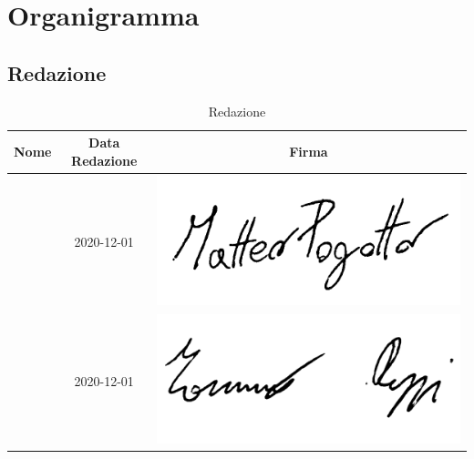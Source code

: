 \section{Organigramma}

\subsection{Redazione}

\renewcommand{\arraystretch}{1}
	\begin{table}[H]
		\begin{center}
			\setlength{\aboverulesep}{0pt}
			\setlength{\belowrulesep}{0pt}
			\setlength{\extrarowheight}{.75ex}
			\begin{tabular}{ c c c }
				\rowcolor{AzzurroGruppo!30} 
				\textbf{Nome} & \textbf{Data Redazione} & \textbf{Firma} \\
				\toprule
				
				\Matteo{} & 2020-12-01 & \includegraphics[scale = 0.12]{components/img/firme_membri/firma-mp.png} \\
				\Tommaso{} & 2020-12-01 & \includegraphics[scale = 0.5]{components/img/firme_membri/firma-tp.png} \\
				
				\bottomrule
			\end{tabular}
			\caption{Redazione}
		\end{center}
	\end{table}

